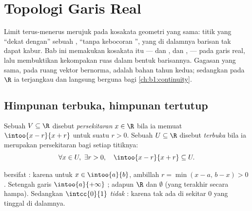 \chapter{Topologi Garis Real}\label{ch:b1:topology}

Limit terus-menerus merujuk pada kosakata geometri yang sama: titik
yang ``dekat dengan'' sebuah ,  ``tanpa kebocoran '',  yang
di dalamnya barisan tak dapat kabur. Bab ini memakukan kosakata itu ---
 dan ,  dan ,  --- pada garis
real, lalu membuktikan kekompakan ruas dalam bentuk barisannya.
Gagasan yang sama, pada ruang vektor bernorma, adalah bahan tahun kedua;
sedangkan pada $\R$ ia terjangkau dan langsung berguna bagi
\cref{ch:b1:continuity}.

\section{Himpunan terbuka, himpunan tertutup}

\begin{definition}\label{def:b1:topology:open}
Sebuah  $V \subseteq \R$ disebut \emph{persekitaran}
$x \in \R$ bila ia memuat  $\intoo{x - r}{x + r}$ untuk
suatu $r > 0$. Sebuah  $U \subseteq \R$ disebut \emph{terbuka}
bila ia merupakan persekitaran bagi setiap titiknya:
\[
\forall x \in U,\ \exists r > 0, \quad \intoo{x - r}{x + r}
\subseteq U .
\]
\end{definition}

\begin{example}\label{ex:b1:topology:open}
  bersifat : karena untuk $x \in \intoo{a}{b}$, ambillah $r = \min(x -
a,\, b - x) > 0$. Setengah garis $\intoo{a}{+\infty}$ ; adapun $\R$ dan
$\emptyset$  (yang terakhir secara hampa). Sedangkan $\intcc{0}{1}$
\emph{tidak} : karena tak ada  di sekitar $0$ yang tinggal di dalamnya.
\end{example}

